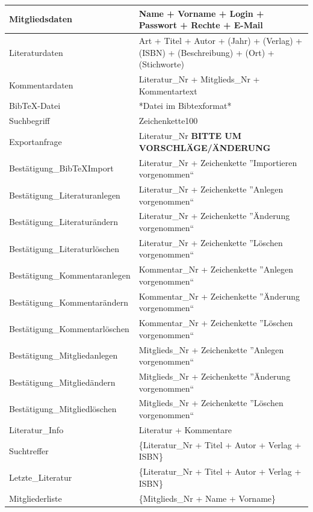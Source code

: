 \begin{longtable}{|l|p{8.5cm}|}
Mitgliedsdaten & Name + Vorname + Login + Passwort + Rechte + E-Mail\\
\hline
Literaturdaten & Art + Titel + Autor + (Jahr) + (Verlag) + (ISBN) + (Beschreibung) + (Ort) + (Stichworte) \\
\hline
Kommentardaten & Literatur\_Nr + Mitglieds\_Nr + Kommentartext \\
\hline
BibTeX-Datei & *Datei im Bibtexformat* \\
\hline
Suchbegriff & Zeichenkette100 \\
\hline
Exportanfrage & Literatur\_Nr \textbf{BITTE UM VORSCHLÄGE/ÄNDERUNG} \\
\hline\hline

Bestätigung\_BibTeXImport & Literatur\_Nr + Zeichenkette ''Importieren vorgenommen`` \\
\hline
Bestätigung\_Literaturanlegen & Literatur\_Nr + Zeichenkette ''Anlegen vorgenommen`` \\
\hline
Bestätigung\_Literaturändern & Literatur\_Nr + Zeichenkette ''Änderung vorgenommen`` \\
\hline
Bestätigung\_Literaturlöschen & Literatur\_Nr + Zeichenkette ''Löschen vorgenommen`` \\
\hline
Bestätigung\_Kommentaranlegen & Kommentar\_Nr + Zeichenkette ''Anlegen vorgenommen`` \\
\hline
Bestätigung\_Kommentarändern & Kommentar\_Nr + Zeichenkette ''Änderung vorgenommen`` \\
\hline
Bestätigung\_Kommentarlöschen & Kommentar\_Nr + Zeichenkette ''Löschen vorgenommen`` \\
\hline
Bestätigung\_Mitgliedanlegen & Mitglieds\_Nr + Zeichenkette ''Anlegen vorgenommen`` \\
\hline
Bestätigung\_Mitgliedändern & Mitglieds\_Nr + Zeichenkette ''Änderung vorgenommen`` \\
\hline
Bestätigung\_Mitgliedlöschen & Mitglieds\_Nr + Zeichenkette ''Löschen vorgenommen`` \\
\hline
Literatur\_Info & Literatur + Kommentare \\
\hline
Suchtreffer & \{Literatur\_Nr + Titel + Autor + Verlag + ISBN\}\\
\hline
Letzte\_Literatur & \{Literatur\_Nr + Titel + Autor + Verlag + ISBN\}\\
\hline
Mitgliederliste & \{Mitglieds\_Nr + Name + Vorname\}\\
\hline
\end{longtable}

